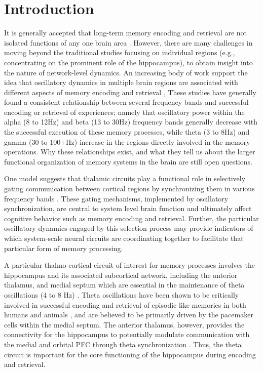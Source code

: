 \documentclass[11pt, titlepage, twoside]{article}
\begin{document}
\section{Introduction}\label{sec:intro}

It is generally accepted that long-term memory encoding and retrieval are not isolated functions of any one brain area \parencite{Gabrieli98,PrinceDaselaarCabeza05}.  However, there are many challenges in moving beyond the traditional studies focusing on individual regions  (e.g., concentrating on the prominent role of the hippocampus), to obtain insight into the nature of network-level dynamics.  An increasing body of work support the idea that oscillatory dynamics in multiple brain regions are associated with different aspects of  memory encoding and retrieval \parencite{NyhusCurran10,HanslmayrStaudiglFellner12,Klimesch12}, %
These studies have generally found a consistent relationship between several frequency bands and successful encoding or retrieval of experiences; namely that oscillatory power within the alpha (8 to 12Hz) and beta (13 to 30Hz) frequency bands generally decrease with the successful execution of these memory processes, while theta (3 to 8Hz) and gamma (30 to 100+Hz) increase in the regions directly involved in the memory operations. Why these relationships exist, and what they tell us about the larger functional organization of memory systems in the brain are still open questions.

One model suggests that thalamic circuits play a functional role in selectively gating communication between cortical regions by synchronizing them in various frequency bands \parencite{ShermanGuillery06,SaalmannKastner11,KetzJensenOReilly15}.  These gating mechanisms, implemented  by oscillatory synchronization, are central to system level brain function and ultimately affect cognitive behavior such as memory encoding and retrieval.  Further, the particular oscillatory dynamics engaged by this selection process may provide indicators of which system-scale neural circuits are coordinating together to facilitate that particular form of memory processing.

A particular thalmo-cortical circuit of interest for memory processes involves the hippocampus and its associated subcortical network, including the anterior thalamus, and medial septum which are essential in the maintenance of theta oscillations (4 to 8 Hz) \parencite{Buzsaki02}.  Theta oscillations have been shown to be critically involved in successful encoding and retrieval of episodic like memories in both humans and animals \parencite{NyhusCurran10,JonesWilson05,FuentemillaBarnesDuzelEtAl14}, and are believed to be primarily driven by the pacemaker cells within the medial septum.  The anterior thalamus, however,  provides the connectivity for the hippocampus to potentially modulate communication with the medial and orbital PFC through theta synchronization \parencite{VanderWerfJollesWitterEtAl03,AggletonDumontWarburton11}.  Thus, the theta circuit is important for the core functioning of the hippocampus during encoding and retrieval.
\end{document}
